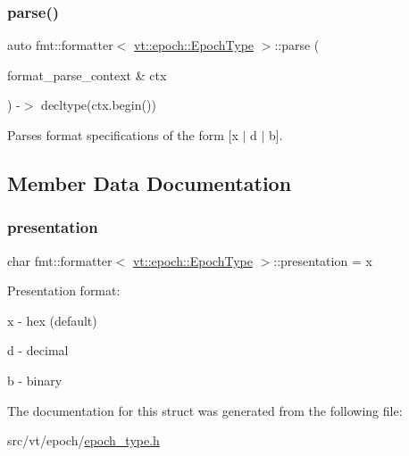 \subsubsection{\texorpdfstring{parse()}{parse()}}
{\footnotesize\ttfamily auto fmt\+::formatter$<$ \hyperlink{structvt_1_1epoch_1_1_epoch_type}{vt\+::epoch\+::\+Epoch\+Type} $>$\+::parse (\begin{DoxyParamCaption}\item[{format\+\_\+parse\+\_\+context \&}]{ctx }\end{DoxyParamCaption}) -\/$>$ decltype(ctx.\+begin()) \hspace{0.3cm}{\ttfamily [inline]}}



Parses format specifications of the form \mbox{[}\textquotesingle{}x\textquotesingle{} $\vert$ \textquotesingle{}d\textquotesingle{} $\vert$ \textquotesingle{}b\textquotesingle{}\mbox{]}. 



\subsection{Member Data Documentation}
\mbox{\label{structfmt_1_1formatter_3_01vt_1_1epoch_1_1_epoch_type_01_4_ac1feeb2c08d651fe22aa6fc600a207cf}} 
\subsubsection{\texorpdfstring{presentation}{presentation}}
{\footnotesize\ttfamily char fmt\+::formatter$<$ \hyperlink{structvt_1_1epoch_1_1_epoch_type}{vt\+::epoch\+::\+Epoch\+Type} $>$\+::presentation = \textquotesingle{}x\textquotesingle{}}

Presentation format\+:
\begin{DoxyItemize}
\item \textquotesingle{}x\textquotesingle{} -\/ hex (default)
\item \textquotesingle{}d\textquotesingle{} -\/ decimal
\item \textquotesingle{}b\textquotesingle{} -\/ binary 
\end{DoxyItemize}

The documentation for this struct was generated from the following file\+:\begin{DoxyCompactItemize}
\item 
src/vt/epoch/\hyperlink{epoch__type_8h}{epoch\+\_\+type.\+h}\end{DoxyCompactItemize}
